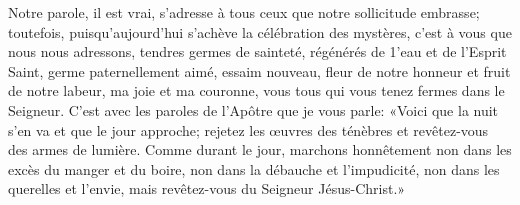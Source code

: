 Notre parole, il est vrai, s’adresse à tous ceux que notre sollicitude embrasse;
	toutefois, puisqu’aujourd’hui s’achève la célébration des mystères,
	c’est à vous que nous nous adressons, tendres germes de sainteté,
	régénérés de 1’eau et de l’Esprit Saint,
	germe paternellement aimé, essaim nouveau,
	fleur de notre honneur et fruit de notre labeur, ma joie et ma couronne,
	vous tous qui vous tenez fermes dans le Seigneur.
C’est avec les paroles de l’Apôtre que je vous parle:
	«Voici que la nuit s’en va et que le jour approche;
	rejetez les œuvres des ténèbres et revêtez-vous des armes de lumière.
Comme durant le jour, marchons honnêtement
	non dans les excès du manger et du boire,
	non dans la débauche et l’impudicité,
	non dans les querelles et l’envie,
	mais revêtez-vous du Seigneur Jésus-Christ.»
